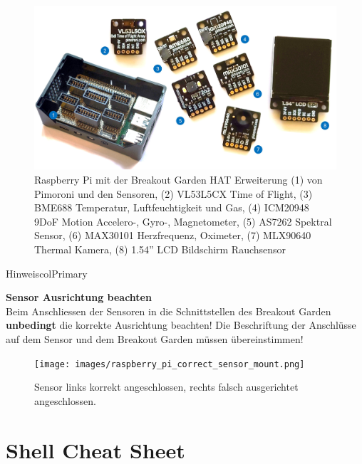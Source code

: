 \documentclass[
  11pt,
  a4paperpaper,
  oneside, openany  ,captions=tableheading
]{scrbook}
\theoremstyle{definition}
\theoremstyle{remark}
\begin{document}
\begin{figure}[H]

{\centering \includegraphics{images/raspberry_pi_set_number.jpg}

}

\caption{Raspberry Pi mit der Breakout Garden HAT Erweiterung (1) von
Pimoroni und den Sensoren, (2) VL53L5CX Time of Flight, (3) BME688
Temperatur, Luftfeuchtigkeit und Gas, (4) ICM20948 9DoF Motion
Accelero-, Gyro-, Magnetometer, (5) AS7262 Spektral Sensor, (6) MAX30101
Herzfrequenz, Oximeter, (7) MLX90640 Thermal Kamera, (8) 1.54'' LCD
Bildschirm Rauchsensor}

\end{figure}%

\begin{boxtitle}{Hinweis}{colPrimary}

\textbf{Sensor Ausrichtung beachten}\\
Beim Anschliessen der Sensoren in die Schnittstellen des Breakout Garden
\textbf{unbedingt} die korrekte Ausrichtung beachten! Die Beschriftung
der Anschlüsse auf dem Sensor und dem Breakout Garden müssen
übereinstimmen!

\begin{figure}[H]

{\centering \texttt{[image: images/raspberry\_pi\_correct\_sensor\_mount.png]}

}

\caption{Sensor links korrekt angeschlossen, rechts falsch ausgerichtet
angeschlossen.}

\end{figure}%

\end{boxtitle}

\chapter{Shell Cheat Sheet}\label{shell-cheat-sheet}
\end{document}
